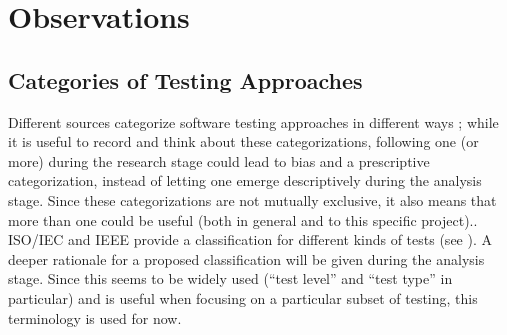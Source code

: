 \section{Observations}
\label{observ}

\subsection{Categories of Testing Approaches}
\label{categories-observ}

\ifnotpaper
      \begin{landscape}
            \ieeeTestTermsTable{}
      \end{landscape}

      \begin{landscape}
            \otherTestTermsTable{}
      \end{landscape}
      \restoregeometry
\else%
\fi

Different sources categorize software testing approaches in different ways%
\ifnotpaper
      ; while it is useful to record and think about these
      categorizations, following one (or more)
      during the research
      stage could lead to bias and a prescriptive categorization, instead of letting
      one emerge descriptively during the analysis stage. Since these categorizations
      are not mutually exclusive, it also means that more than one could be useful
      (both in general and to this specific project).\newline \else.\fi\
\ifnotpaper \citet{IEEE2022} \else ISO/IEC and IEEE \cite{IEEE2022} \fi provide
a classification for different kinds of tests (see \refIEEETestTerms{}).
\ifnotpaper A deeper rationale for a proposed classification will be given
      during the analysis stage. \else Since
      this seems to be widely used (``test level'' and ``test type'' in particular)
      and is useful when focusing on a particular subset of testing, this terminology
      is used for now. \fi

